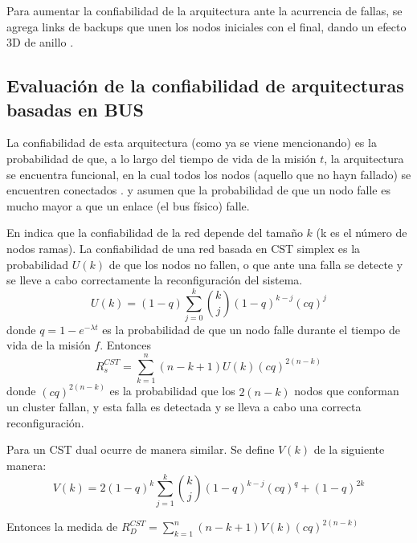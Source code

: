 Para aumentar la confiabilidad de la arquitectura ante la acurrencia de fallas, se agrega links de backups que unen los nodos iniciales con el final, dando un efecto 3D de anillo \citep{Tai99}.

\subsection{Evaluación de la confiabilidad de arquitecturas basadas en BUS}
La confiabilidad de esta arquitectura (como ya se viene mencionando) es la probabilidad de que, a lo largo del tiempo de vida de la misión $t$, la arquitectura se encuentra funcional, en la cual todos los nodos (aquello que no hayn fallado) se encuentren conectados \citep{Tai99}. \citep{Tai99} y \citep{Chau99} asumen que la probabilidad de que un nodo falle es mucho mayor a que un enlace (el bus físico) falle.

En \cite{Tai99} indica que la confiabilidad de la red depende del tamaño $k$ (k es el número de nodos ramas). La confiabilidad de una red basada en \ac{CST} simplex es la probabilidad $U(k)$ de que los nodos no fallen, o que ante una falla se detecte y se lleve a cabo correctamente la reconfiguración del sistema. $$U(k) = (1-q) \sum_{j=0}^{k} {{k}\choose{j}} (1-q)^{k-j} (cq)^j $$ donde $q = 1-e^{-\lambda t}$ es la probabilidad de que un nodo falle durante el tiempo de vida de la misión $f$. Entonces $$R_s^{CST} = \sum_{k=1}^n (n-k+1)U(k)(cq)^{2(n-k)}$$ donde $(cq)^{2(n-k)}$ es la probabilidad que los  $2(n-k)$ nodos que conforman un cluster fallan, y esta falla es detectada y se lleva a cabo una correcta reconfiguración.

Para un \ac{CST} dual ocurre de manera similar. Se define $V(k)$ de la siguiente manera: $$V(k) = 2(1-q)^k \sum_{j=1}^k {{k}\choose{j}} (1-q)^{k-j} (cq)^q + (1-q)^{2k}$$

Entonces la medida de $R_D^{CST} =  \sum_{k=1}^n (n-k+1) V(k) (cq)^{2(n-k)}$
